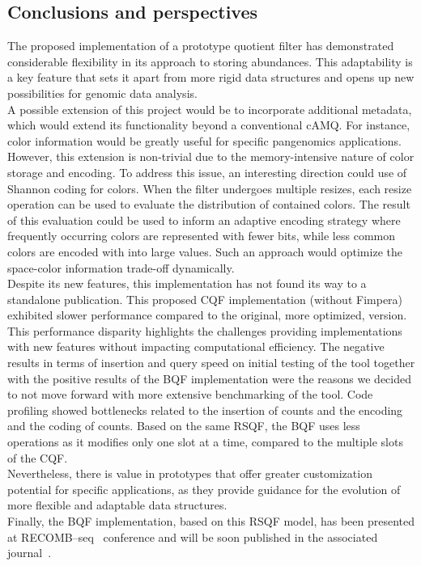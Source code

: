 \subsection{Conclusions and perspectives}
The proposed implementation of a prototype quotient filter has demonstrated considerable flexibility in its approach to storing \kmer abundances. This adaptability is a key feature that sets it apart from more rigid data structures and opens up new possibilities for genomic data analysis.\\
A possible extension of this project would be to incorporate additional metadata, which would extend its functionality beyond a conventional cAMQ. For instance, color information would be greatly useful for specific pangenomics applications. However, this extension is non-trivial due to the memory-intensive nature of color storage and encoding. To address this issue, an interesting direction could use of Shannon coding for colors. When the filter undergoes multiple resizes, each resize operation can be used to evaluate the distribution of contained colors. The result of this evaluation could be used to inform an adaptive encoding strategy where frequently occurring colors are represented with fewer bits, while less common colors are encoded with into large values. Such an approach would optimize the space-color information trade-off dynamically.\\
Despite its new features, this implementation has not found its way to a standalone publication. This proposed CQF implementation (without Fimpera) exhibited slower performance compared to the original, more optimized, version. This performance disparity highlights the challenges providing implementations with new features without impacting computational efficiency. The negative results in terms of insertion and query speed on initial testing of the tool together with the positive results of the BQF implementation were the reasons we decided to not move forward with more extensive benchmarking of the tool. Code profiling showed bottlenecks related to the insertion of counts and the encoding and the coding of counts. Based on the same RSQF, the BQF uses less operations as it modifies only one slot at a time, compared to the multiple slots of the CQF.\\
Nevertheless, there is value in prototypes that offer greater customization potential for specific applications, as they provide guidance for the evolution of more flexible and adaptable data structures.\\
Finally, the BQF implementation, based on this RSQF model, has been presented at RECOMB–seq~\cite{recombseq} conference and will be soon published in the associated journal~\cite{bqf}.

